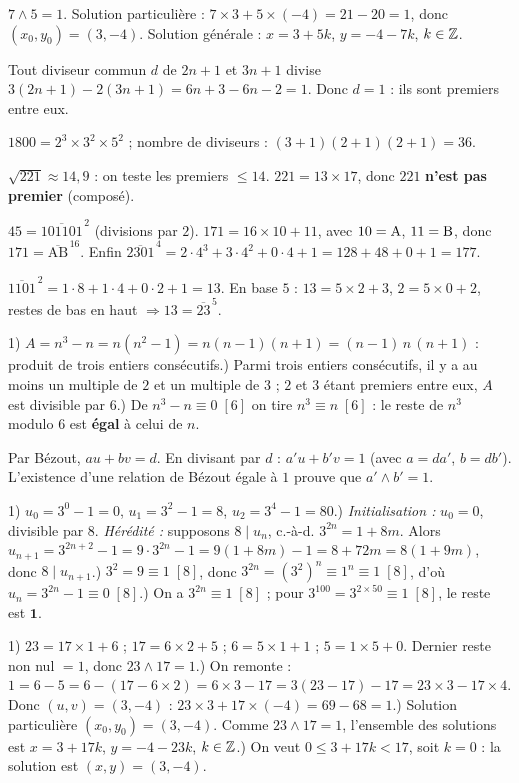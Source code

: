 $7\wedge5=1$. Solution particulière : $7\times3+5\times(-4)=21-20=1$, donc $(x_0,y_0)=(3,-4)$. Solution générale : $x=3+5k$, $y=-4-7k$, $k\in\mathbb{Z}$.

Tout diviseur commun $d$ de $2n+1$ et $3n+1$ divise $3(2n+1)-2(3n+1)=6n+3-6n-2=1$. Donc $d=1$ : ils sont premiers entre eux.

$1800=2^{3}\times 3^{2}\times 5^{2}$ ; nombre de diviseurs : $(3{+}1)(2{+}1)(2{+}1)=36$.

$\sqrt{221}\approx14{,}9$ : on teste les premiers $\le14$. $221=13\times17$, donc $221$ \textbf{n'est pas premier} (composé).

$45=\overline{101101}^{\,2}$ (divisions par $2$). $171=16\times 10+11$, avec $10=\text A$, $11=\text B$, donc $171=\overline{\text{AB}}^{\,16}$. Enfin $\overline{2301}^{\,4}=2\cdot 4^{3}+3\cdot 4^{2}+0\cdot 4+1=128+48+0+1=177$.

$\overline{1101}^{\,2}=1\cdot8+1\cdot4+0\cdot2+1=13$. En base $5$ : $13=5\times2+3$, $2=5\times0+2$, restes de bas en haut $\Rightarrow 13=\overline{23}^{\,5}$.

1) $A=n^{3}-n=n(n^{2}-1)=n(n-1)(n+1)=(n-1)\,n\,(n+1)$ : produit de trois entiers consécutifs.) Parmi trois entiers consécutifs, il y a au moins un multiple de $2$ et un multiple de $3$ ; $2$ et $3$ étant premiers entre eux, $A$ est divisible par $6$.) De $n^{3}-n\equiv 0\;[6]$ on tire $n^{3}\equiv n\;[6]$ : le reste de $n^{3}$ modulo $6$ est \textbf{égal} à celui de $n$.

Par Bézout, $au+bv=d$. En divisant par $d$ : $a'u+b'v=1$ (avec $a=da'$, $b=db'$). L'existence d'une relation de Bézout égale à $1$ prouve que $a'\wedge b'=1$.

1) $u_0=3^0-1=0$, $u_1=3^2-1=8$, $u_2=3^4-1=80$.) \emph{Initialisation :} $u_0=0$, divisible par $8$. \emph{Hérédité :} supposons $8\mid u_n$, c.-à-d. $3^{2n}=1+8m$. Alors $u_{n+1}=3^{2n+2}-1=9\cdot3^{2n}-1=9(1+8m)-1=8+72m=8(1+9m)$, donc $8\mid u_{n+1}$.) $3^2=9\equiv1\;[8]$, donc $3^{2n}=(3^2)^n\equiv1^n\equiv1\;[8]$, d'où $u_n=3^{2n}-1\equiv0\;[8]$.) On a $3^{2n}\equiv1\;[8]$ ; pour $3^{100}=3^{2\times50}\equiv1\;[8]$, le reste est $\mathbf 1$.

1) $23=17\times1+6$ ; $17=6\times2+5$ ; $6=5\times1+1$ ; $5=1\times5+0$. Dernier reste non nul $=1$, donc $23\wedge17=1$.) On remonte : $1=6-5=6-(17-6\times2)=6\times3-17=3(23-17)-17=23\times3-17\times4$. Donc $(u,v)=(3,-4)$ : $23\times3+17\times(-4)=69-68=1$.) Solution particulière $(x_0,y_0)=(3,-4)$. Comme $23\wedge17=1$, l'ensemble des solutions est $x=3+17k$, $y=-4-23k$, $k\in\mathbb{Z}$.) On veut $0\le 3+17k<17$, soit $k=0$ : la solution est $(x,y)=(3,-4)$.

